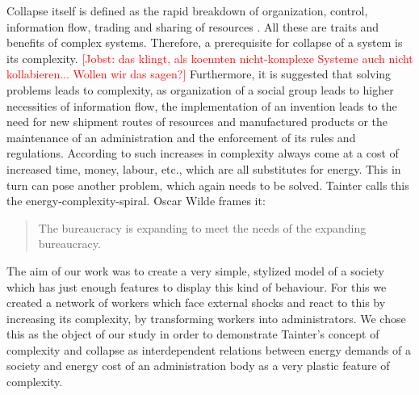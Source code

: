 Collapse itself is defined as the rapid breakdown of organization, control, information flow, trading and sharing of resources \cite{Tainter.2011}. All these are traits and benefits of complex systems.
Therefore, a prerequisite for collapse of a system is its complexity.
\textcolor{red}{[Jobst: das klingt, als koennten nicht-komplexe Systeme auch nicht kollabieren... Wollen wir das sagen?]}
Furthermore, it is suggested that solving problems leads to complexity, as organization of a social group leads to higher necessities of information flow, the implementation of an invention leads to the need for new shipment routes of resources and manufactured products or the maintenance of an administration and the enforcement of its rules and regulations. According to \cite{Tainter.2011} such increases in complexity always come at a cost of increased time, money, labour, etc., which are all substitutes for energy. This in turn can pose another problem, which again needs to be solved. Tainter calls this the energy-complexity-spiral. Oscar Wilde frames it:
\begin{quote}
    The bureaucracy is expanding to meet the needs of the expanding bureaucracy.
\end{quote}
The aim of our work was to create a very simple, stylized model of a society which has just enough features to display this kind of behaviour. For this we created a network of workers which face external shocks and react to this by increasing its complexity, by transforming workers into administrators. We chose this as the object of our study in order to demonstrate Tainter's concept of complexity and collapse as interdependent relations between energy demands of a society and energy cost of an administration body as a very plastic feature of complexity.

